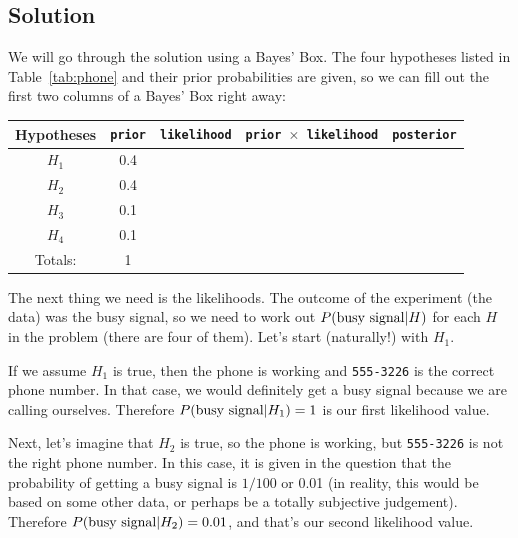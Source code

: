 \subsection{Solution}
We will go through the solution using a Bayes' Box. The four hypotheses listed
in Table~\ref{tab:phone} and their prior probabilities are given, so we can fill
out the first two columns of a Bayes' Box right away:
\begin{table}[h!]
\begin{center}
\begin{tabular}{|c|c|c|c|c|}
\hline
{\bf Hypotheses} & {\tt prior} & {\tt likelihood} &
{\tt prior $\times$ likelihood} & {\tt posterior}\\
\hline
$H_1$ & 0.4 &  &  & \\
$H_2$ & 0.4 &  &  & \\
$H_3$ & 0.1 &  &  & \\
$H_4$ & 0.1 &  &  & \\
\hline
Totals: & 1 & & & \\
\hline
\end{tabular}
\end{center}
\end{table}
The next thing we need is the likelihoods. The outcome of the experiment (the
data) was the busy signal, so we need to work out $P(\textnormal{busy signal} | H)$ for each $H$
in the problem (there are four of them). Let's start (naturally!) with $H_1$.

If we assume $H_1$ is true, then the phone is working and {\tt 555-3226} is the
correct phone number. In that case, we would definitely get a busy signal
because we are calling ourselves. Therefore
$P(\textnormal{busy signal} | H_1) = 1$ is our first likelihood value.

Next, let's imagine that $H_2$ is true, so the phone is working, but
{\tt 555-3226} is not the right phone number. In this case, it is given in the
question that the probability of getting a busy signal is $1/100$ or 0.01 (in
reality, this would be based on some other data, or perhaps be a totally
subjective judgement).
Therefore $P(\textnormal{busy signal} | H_2) = 0.01$, and that's our second
likelihood value.

